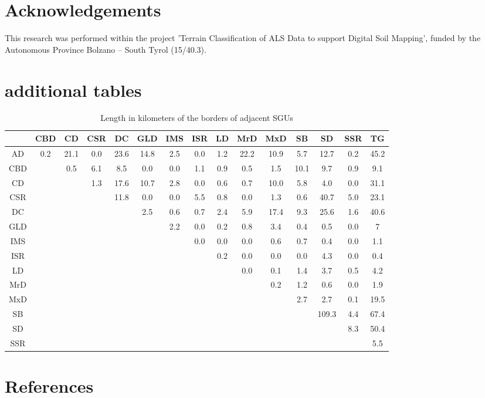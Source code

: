 \documentclass[preprint,12pt,authoryear]{elsarticle}
\begin{document}
\section*{Acknowledgements} This research was performed within the project 'Terrain Classification of ALS Data to support Digital Soil Mapping', funded by the Autonomous Province Bolzano -- South Tyrol (15/40.3).

\section*{additional tables}
\begin{table}[ht]
\centering
\tabcolsep=0.06cm
\small
\begin{tabular}{ccccccccccccccc}
  \hline
 & CBD & CD & CSR & DC & GLD & IMS & ISR & LD  & MrD & MxD & SB & SD & SSR & TG \\ 
  \hline
AD & 0.2 & 21.1 & 0.0 & 23.6 & 14.8 & 2.5 & 0.0 & 1.2  & 22.2 & 10.9 & 5.7 & 12.7 & 0.2 & 45.2 \\ 
  CBD &  & 0.5 & 6.1 & 8.5 & 0.0 & 0.0 & 1.1 & 0.9  & 0.5 & 1.5 & 10.1 & 9.7 & 0.9 & 9.1 \\ 
  CD &  &  & 1.3 & 17.6 & 10.7 & 2.8 & 0.0 & 0.6  & 0.7 & 10.0 & 5.8 & 4.0 & 0.0 & 31.1\\ 
  CSR &  &  &  & 11.8 & 0.0 & 0.0 & 5.5 & 0.8  & 0.0 & 1.3 & 0.6 & 40.7 & 5.0 & 23.1 \\ 
  DC &  &  &  &  & 2.5 & 0.6 & 0.7 & 2.4  & 5.9 & 17.4 & 9.3 & 25.6 & 1.6 & 40.6 \\ 
  GLD &  &  &  &  &  & 2.2 & 0.0 & 0.2  & 0.8 & 3.4 & 0.4 & 0.5 & 0.0 & 7 \\ 
  IMS &  &  &  &  &  &  & 0.0 & 0.0  & 0.0 & 0.6 & 0.7 & 0.4 & 0.0 & 1.1 \\ 
  ISR &  &  &  &  &  &  &  & 0.2 & 0.0 & 0.0 & 0.0 & 4.3 & 0.0 & 0.4 \\ 
  LD &  &  &  &  &  &  &  &   & 0.0 & 0.1 & 1.4 & 3.7 & 0.5 & 4.2 \\ 
  MrD  &  &  &  &  &  &  &  &  &  & 0.2 & 1.2 & 0.6 & 0.0 & 1.9 \\ 
  MxD  &  &  &  &  &  &  &  &  &  &  & 2.7 & 2.7 & 0.1 & 19.5 \\ 
  SB  &  &  &  &  &  &  &  &  &  &  &  & 109.3 & 4.4 & 67.4\\ 
  SD  &  &  &  &  &  &  &  &  &  &  &  &  & 8.3 & 50.4 \\ 
  SSR  &  &  &  &  &  &  &  &  &  &  &  &  &  & 5.5 \\ 
   \hline
\end{tabular}
\caption{Length in kilometers of the borders of adjacent SGUs} 
\label{table:borderlength}
\end{table}
\section*{References}

\end{document}
